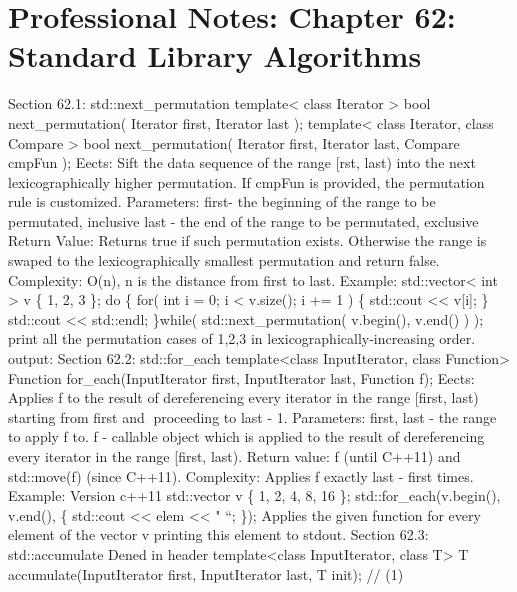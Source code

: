 \hypertarget{professional-notes-chapter-62-standard-library-algorithms-1}{%
\chapter{Professional Notes: Chapter 62: Standard Library
Algorithms}\label{professional-notes-chapter-62-standard-library-algorithms-1}}

Section 62.1: std::next\_permutation template\textless{} class Iterator
\textgreater{} bool next\_permutation( Iterator first, Iterator last );
template\textless{} class Iterator, class Compare \textgreater{} bool
next\_permutation( Iterator first, Iterator last, Compare cmpFun );
Eects: Sift the data sequence of the range {[}rst, last) into the next
lexicographically higher permutation. If cmpFun is provided, the
permutation rule is customized. Parameters: first- the beginning of the
range to be permutated, inclusive last - the end of the range to be
permutated, exclusive Return Value: Returns true if such permutation
exists. Otherwise the range is swaped to the lexicographically smallest
permutation and return false. Complexity: O(n), n is the distance from
first to last. Example: std::vector\textless{} int \textgreater{} v \{
1, 2, 3 \}; do \{ for( int i = 0; i \textless{} v.size(); i += 1 ) \{
std::cout \textless\textless{} v{[}i{]}; \} std::cout
\textless\textless{} std::endl; \}while( std::next\_permutation(
v.begin(), v.end() ) ); print all the permutation cases of 1,2,3 in
lexicographically-increasing order. output: Section 62.2: std::for\_each
template\textless class InputIterator, class Function\textgreater{}
Function for\_each(InputIterator first, InputIterator last, Function f);
Eects: Applies f to the result of dereferencing every iterator in the
range {[}first, last) starting from first and proceeding to last - 1.
Parameters: first, last - the range to apply f to. f - callable object
which is applied to the result of dereferencing every iterator in the
range {[}first, last). Return value: f (until C++11) and std::move(f)
(since C++11). Complexity: Applies f exactly last - first times.
Example: Version c++11 std::vector v \{ 1, 2, 4, 8, 16 \};
std::for\_each(v.begin(), v.end(), \href{int\%20elem}{} \{ std::cout
\textless\textless{} elem \textless\textless{} " ``; \}); Applies the
given function for every element of the vector v printing this element
to stdout. Section 62.3: std::accumulate Dened in header
template\textless class InputIterator, class T\textgreater{} T
accumulate(InputIterator first, InputIterator last, T init); // (1)
